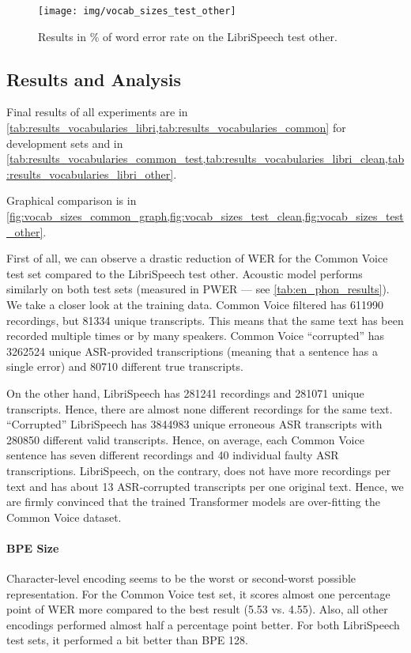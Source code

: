 \begin{figure}[p]
	\centering
	\texttt{[image: img/vocab\_sizes\_test\_other]}
	\caption{Results in \% of word error rate on the LibriSpeech test other.}
	\label{fig:vocab_sizes_test_other}
\end{figure}



\subsection{Results and Analysis}

Final results of all experiments are in \cref{tab:results_vocabularies_libri,tab:results_vocabularies_common} for development sets and in \cref{tab:results_vocabularies_common_test,tab:results_vocabularies_libri_clean,tab:results_vocabularies_libri_other}.

Graphical comparison is in \cref{fig:vocab_sizes_common_graph,fig:vocab_sizes_test_clean,fig:vocab_sizes_test_other}.

First of all, we can observe a drastic reduction of WER for the Common Voice test set compared to the LibriSpeech test other. Acoustic model performs similarly on both test sets (measured in PWER --- see \cref{tab:en_phon_results}). We take a closer look at the training data. Common Voice filtered has 611990 recordings, but 81334 unique transcripts. This means that the same text has been recorded multiple times or by many speakers. Common Voice ``corrupted'' has 3262524 unique ASR-provided transcriptions (meaning that a sentence has a single error) and 80710 different true transcripts.

On the other hand, LibriSpeech has 281241 recordings and 281071 unique transcripts. Hence, there are almost none different recordings for the same text. ``Corrupted'' LibriSpeech has 3844983 unique erroneous ASR transcripts with 280850 different valid transcripts. Hence, on average, each Common Voice sentence has seven different recordings and 40 individual faulty ASR transcriptions. LibriSpeech, on the contrary, does not have more recordings per text and has about 13 ASR-corrupted transcripts per one original text. Hence, we are firmly convinced that the trained Transformer models are over-fitting the Common Voice dataset.

\paragraph{BPE Size}
Character-level encoding seems to be the worst or second-worst possible representation. For the Common Voice test set, it scores almost one percentage point of WER more compared to the best result (5.53 vs. 4.55). Also, all other encodings performed almost half a percentage point better. For both LibriSpeech test sets, it performed a bit better than BPE 128. 

